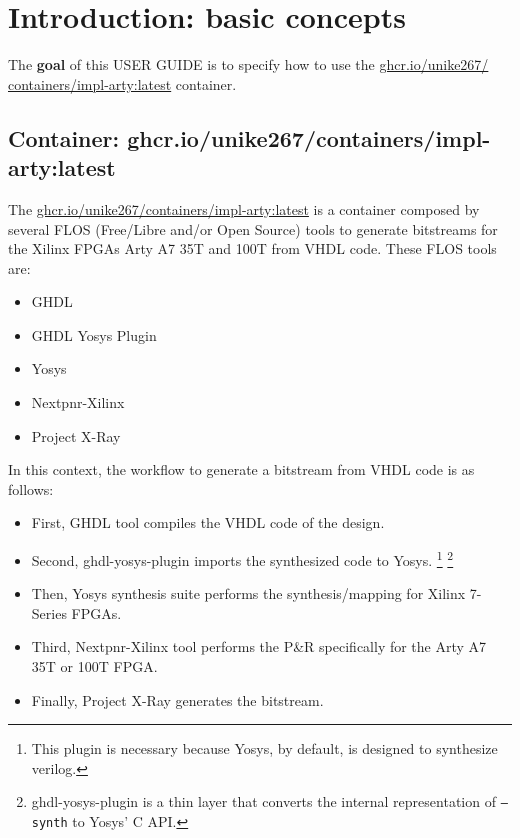 \section{Introduction: basic concepts}

\label{intro}

The \textbf{goal} of this USER GUIDE is to specify how to use the \href{https://github.com/Unike267/Containers/pkgs/container/containers\%2Fimpl-arty}{ghcr.io/unike267/ containers/impl-arty:latest} container.

\subsection{Container: ghcr.io/unike267/containers/impl-arty:latest}

The \href{https://github.com/Unike267/Containers/pkgs/container/containers\%2Fimpl-arty}{ghcr.io/unike267/containers/impl-arty:latest} \cite{gh:container-implarty} is a container composed by several FLOS (Free/Libre and/or Open Source) tools to generate bitstreams for the Xilinx FPGAs Arty A7 35T and 100T from VHDL code.
These FLOS tools are:

\begin{itemize}
    \item GHDL \cite{gh:ghdl}
    \item GHDL Yosys Plugin \cite{gh:ghdl-plugin}
    \item Yosys \cite{gh:yosys} 
    \item Nextpnr-Xilinx \cite{gh:nextpnr-x}
    \item Project X-Ray \cite{gh:prjxray}
\end{itemize}

\noindent In this context, the workflow to generate a bitstream from VHDL code is as follows:

\begin{itemize}
    \item First, GHDL tool compiles the VHDL code of the design.
    \item Second, ghdl-yosys-plugin imports the synthesized code to Yosys. 
\footnote{This plugin is necessary because Yosys, by default, is designed to synthesize verilog.} 
\footnote{ghdl-yosys-plugin is a thin layer that converts the internal representation of \texttt{--synth} to Yosys’ C API.}
    \item Then, Yosys synthesis suite performs the synthesis/mapping for Xilinx 7-Series FPGAs.
    \item Third, Nextpnr-Xilinx tool performs the P\&R specifically for the Arty A7 35T or 100T FPGA.
    \item Finally, Project X-Ray generates the bitstream.
\end{itemize}

